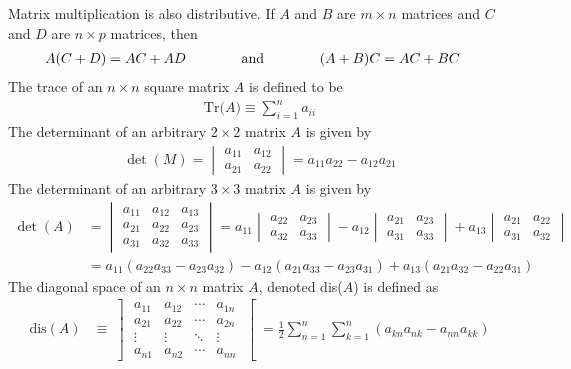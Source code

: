Matrix multiplication is also distributive. If $A$ and $B$ are $m\times n$ matrices and $C$ and $D$ are $n \times p$ matrices, then
\begin{align}
A(C+D)	&=	AC+AD\hspace{1.4cm}\textrm{and}\hspace{1.4cm}
(A+B)C	=	AC+BC
\end{align}
The trace of an $n\times n$ square matrix $A$ is defined to be 
\begin{align}
\textrm{Tr($A$)}\equiv\sum_{i=1}^{n}a_{ii}
\end{align}
The determinant of an arbitrary $2 \times 2$ matrix $A$ is given by
\begin{align}
	\det(M) = \begin{vmatrix}
		a_{11} & a_{12} \\
		a_{21} & a_{22}
	\end{vmatrix} = a_{11}a_{22}-a_{12}a_{21}
\end{align}
The determinant of an arbitrary $3 \times 3$ matrix $A$ is given by
\begin{align}
	\det(A) &= \begin{vmatrix}
		a_{11} & a_{12} & a_{13} \\
		a_{21} & a_{22} & a_{23} \\
		a_{31} & a_{32} & a_{33}
	\end{vmatrix}  = a_{11}\begin{vmatrix}
	a_{22} & a_{23} \\
	a_{32} & a_{33}
\end{vmatrix} -a_{12}\begin{vmatrix}
a_{21} & a_{23} \\
a_{31} & a_{33}
\end{vmatrix} + a_{13}\begin{vmatrix}
a_{21} & a_{22} \\
a_{31} & a_{32}
\end{vmatrix} \\
&=a_{11}(a_{22}a_{33}-a_{23}a_{32})-a_{12}(a_{21}a_{33}-a_{23}a_{31})+a_{13}(a_{21}a_{32}-a_{22}a_{31})
\end{align}
The diagonal space of an $n \times n$ matrix $A$, denoted dis($A$) is defined as
\begin{align}
	\textrm{dis}(A) &\equiv \left] \begin{array}{cccc}
		a_{11} & a_{12} & \cdots & a_{1n} \\
		a_{21} & a_{22} & \cdots & a_{2n} \\
		\vdots & \vdots & \ddots  & \vdots \\
		a_{n1} & a_{n2} & \cdots & a_{nn}
	\end{array} \right[  = \frac{1}{2}\sum_{n=1}^{n}\sum_{k=1}^{n}\left(a_{kn}a_{nk}-a_{nn}a_{kk}\right)
\end{align}
